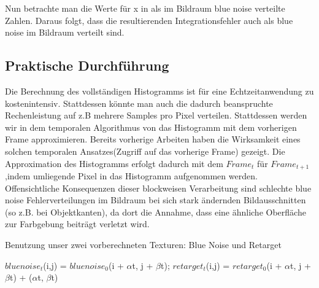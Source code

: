 Nun betrachte man die Werte für x in  als im Bildraum
blue noise verteilte Zahlen. Daraus folgt, dass die resultierenden
Integrationsfehler auch als blue noise im Bildraum verteilt sind.


\subsection{Praktische Durchführung}
Die Berechnung des vollständigen Histogramms ist für eine Echtzeitanwendung
zu kostenintensiv. Stattdessen könnte man auch die dadurch beanspruchte 
Rechenleistung auf z.B mehrere Samples pro Pixel verteilen.
Stattdessen werden wir in dem temporalen Algorithmus von \cite{hal02158423}
das Histogramm mit dem vorherigen Frame approximieren. 
Bereits vorherige Arbeiten \cite{Schied:2018:GER:3273023.3233301} haben die 
Wirksamkeit eines solchen temporalen Ansatzes(Zugriff auf das vorherige Frame)
gezeigt. Die Approximation des Histogramms erfolgt dadurch mit dem $Frame_{t}$ 
für $Frame_{t+1}$,indem umliegende Pixel in das Histogramm aufgenommen werden.
Offensichtliche Konsequenzen dieser blockweisen Verarbeitung sind schlechte blue noise 
Fehlerverteilungen im Bildraum bei sich stark ändernden Bildausschnitten
(so z.B. bei Objektkanten), da dort die Annahme, dass eine ähnliche Oberfläche
zur Farbgebung beiträgt verletzt wird.


\begin{algorithm}[H]
    \caption{Benutzung unser zwei vorberechneten Texturen: Blue Noise und Retarget}
    \begin{algorithmic}[1]
        \State $bluenoise_{t}$(i,j) = $bluenoise_{0}$(i + $\alpha$t, j + $\beta$t); 
        \State $retarget_{t}$(i,j) = $retarget_{0}$(i + $\alpha$t, j + $\beta$t) + ($\alpha$t, $\beta$t)
    \end{algorithmic}
    \label{alg:Benutzung vorberechneter Texturen}
\end{algorithm}

